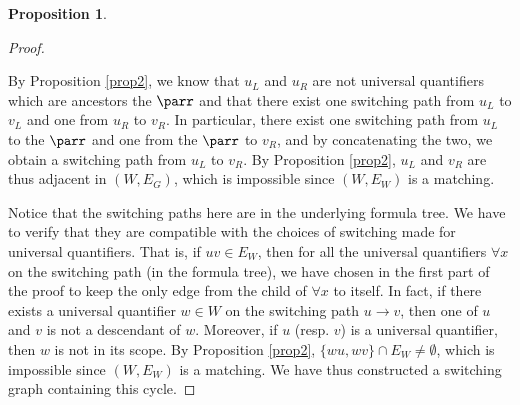 \documentclass[conference]{IEEEtran}
\theoremstyle{definition}
\newtheorem{proposition}[thm]{Proposition}
\begin{document}
\begin{proposition}
\begin{proof}
\begin{itemize}
    By Proposition \ref{prop2}, we know that $u_L$ and $u_R$ are not
	universal quantifiers which are ancestors the $\parr$
	and that there exist one switching path from $u_L$ to $v_L$ and one
	from $u_R$ to $v_R$. In particular, there exist one switching path from
	$u_L$ to the $\parr$ and one from the $\parr$ to $v_R$, and by
	concatenating the two, we obtain a switching path from $u_L$ to $v_R$. 
	By Proposition \ref{prop2}, $u_L$ and $v_R$ are thus adjacent in $(W,
	E_G)$, which is impossible since $(W, E_W)$ is a matching.
  \end{itemize}
  Notice that the switching paths here are in the underlying formula tree. We
  have to verify that they are compatible with the choices of switching made for
  universal quantifiers. That is, if $uv \in E_W$, then for all the
  universal quantifiers $\forall x$ on the switching path (in the formula
	tree), we have chosen in the first part of the proof to keep the only
	edge from the child of $\forall x$ to itself. In fact, if there exists
	a universal quantifier $w \in W$ on the switching path $u \rightarrow
	v$, then one of $u$ and $v$ is not a descendant of $w$. Moreover, if
	$u$ (resp. $v$) is a universal quantifier, then $w$ is not in its scope.
	By Proposition \ref{prop2}, $\{wu, wv\} \cap E_W \neq \emptyset$, which
	is impossible since $(W, E_W)$ is a matching.
  We have thus constructed a switching graph containing this cycle.
\end{proof}
\end{proposition}
\end{document}
